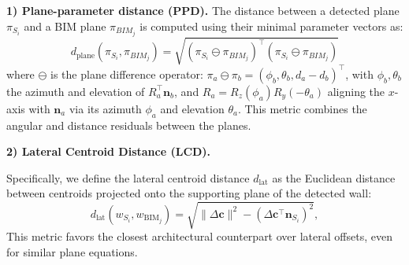 \textbf{1) Plane-parameter distance (PPD).}  
The distance between a detected plane $\pi_{S_i}$ and a BIM plane $\pi_{BIM_j}$ is computed using their minimal parameter vectors as:
\begin{equation}
\label{eq:ppd}
d_\text{plane}(\pi_{S_i},\pi_{BIM_j}) = \sqrt{(\pi_{S_i} \ominus \pi_{BIM_j})^\top (\pi_{S_i} \ominus \pi_{BIM_j})} 
\end{equation}
{where $\ominus$ is the plane difference operator: $\pi_a \ominus \pi_b = (\phi_b, \theta_b, d_a - d_b)^\top$, with $\phi_b, \theta_b$ the azimuth and elevation of $R_a^\top \mathbf{n}_b$, and $R_a = R_z(\phi_a) R_y(-\theta_a)$ aligning the $x$-axis with $\mathbf{n}_a$ via its azimuth $\phi_a$ and elevation $\theta_a$. This metric combines the angular and distance residuals between the planes.}

\textbf{2) Lateral Centroid Distance (LCD).}

Specifically, we define the lateral centroid distance $d_\text{lat}$ as the Euclidean distance between centroids projected onto the supporting plane of the detected wall:
\begin{equation}
d_{\mathrm{lat}}(w_{S_i}, w_{\text{BIM}_j}) =
\sqrt{
\|\Delta\mathbf{c}\|^2 -
\left(\Delta\mathbf{c}^\top \mathbf{n}_{S_i}\right)^2
},
\end{equation}
This metric favors the closest architectural counterpart over lateral offsets, even for similar plane equations.


